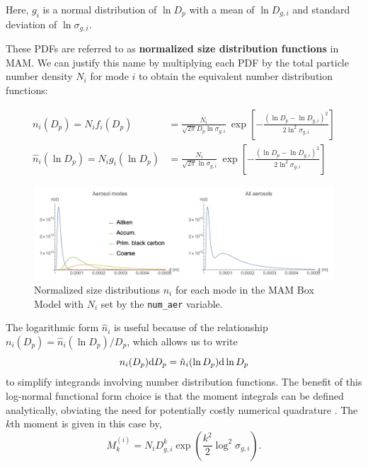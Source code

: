 Here, $g_i$ is a normal distribution of $\ln D_p$ with a mean of $\ln D_{g,i}$
and standard deviation of $\ln\sigma_{g,i}$.

These PDFs are referred to as {\bf normalized size distribution functions} in
MAM. We can justify this name by multiplying each PDF by the total particle
number density $N_i$ for mode $i$ to obtain the equivalent number distribution
functions:

\begin{align}\label{eq:log_normal_n}
  n_i(D_p) = N_i f_i(D_p) &= \frac{N_i}{\sqrt{2\pi} D_p \ln \sigma_{g,i}} \ 
  \exp \left [ - \frac{(\ln D_p - \ln D_{g,i})^2}{2\ln^2\sigma_{g,i}} \right ] \\
  \hat{n}_{i}(\ln D_p) = N_i g_i(\ln D_p) &= \frac{N_i}{\sqrt{2\pi}\ln \sigma_{g,i}} \ 
	\exp \left [ - \frac{(\ln D_p - \ln D_{g,i})^2}{2\ln^2\sigma_{g,i}} \right ]
\end{align}

\begin{figure}
\centering
\includegraphics[width=\textwidth]{figures/pdf_examples}
\caption{Normalized size distributions $n_i$ for each mode in the MAM Box Model with $N_i$ set by the \texttt{num\_aer} variable.}\label{fig:mode_dists}  
\end{figure}

The logarithmic form $\hat{n}_i$ is useful because of the relationship
$ n_i(D_p) = \hat{n}_i(\ln D_p)/D_p$, which allows us to write
\begin{equation} \labeleq{equ_norm_lognorm}
  n_i(D_p) \d{D_p} = \hat{n}_i(\ln D_p) \d{\ln D_p}
\end{equation}
to simplify integrands involving number distribution functions.
The benefit of this log-normal functional form choice is that the moment integrals can be defined analytically, obviating the need for potentially costly numerical quadrature \cite[eqns.~(3.7)]{Whitby1991}.
The $k$th moment is given in this case by,
\begin{equation}
  M_k^{(i)} = N_i D_{g,i}^k \exp\left(\frac{k^2}{2}\log^2\sigma_{g,i}\right).
\end{equation}

